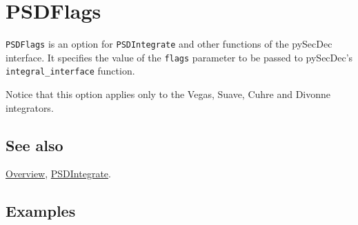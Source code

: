 \documentclass[../FeynHelpersManual.tex]{subfiles}
\begin{document}
\hypertarget{psdflags}{
\section{PSDFlags}\label{psdflags}}

\texttt{PSDFlags} is an option for \texttt{PSDIntegrate} and other
functions of the pySecDec interface. It specifies the value of the
\texttt{flags} parameter to be passed to pySecDec's
\texttt{integral_interface} function.

Notice that this option applies only to the Vegas, Suave, Cuhre and
Divonne integrators.

\subsection{See also}

\hyperlink{toc}{Overview}, \hyperlink{psdintegrate}{PSDIntegrate}.

\subsection{Examples}
\end{document}
